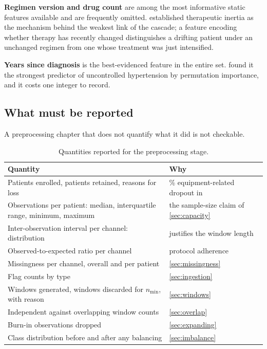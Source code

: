 \documentclass[12pt,a4paper,oneside]{report}
\begin{document}
\textbf{Regimen version and drug count} are among the most informative static features available and are frequently omitted.  established therapeutic inertia as the mechanism behind the weakest link of the cascade; a feature encoding whether therapy has recently changed distinguishes a drifting patient under an unchanged regimen from one whose treatment was just intensified.

\textbf{Years since diagnosis} is the best-evidenced feature in the entire set. \Textcite{mendoza2025} found it the strongest predictor of uncontrolled hypertension by permutation importance, and it costs one integer to record.

\subsection{What must be reported}\label{sec:reporting}

A preprocessing chapter that does not quantify what it did is not checkable.

\begin{table}[htbp]
\centering\footnotesize
\caption{Quantities reported for the preprocessing stage.}\label{tab:preprocessing-report}
\begin{tabularx}{\textwidth}{@{}X >{\raggedright\arraybackslash}p{5.2cm}@{}}
\toprule
\textbf{Quantity} & \textbf{Why} \\
\midrule
Patients enrolled, patients retained, reasons for loss & 10.9\% equipment-related dropout in \textcite{mihevc2025} \\
Observations per patient: median, interquartile range, minimum, maximum & the sample-size claim of \cref{sec:capacity} \\
Inter-observation interval per channel: distribution & justifies the window length \\
Observed-to-expected ratio per channel & protocol adherence \\
Missingness per channel, overall and per patient & \cref{sec:missingness} \\
Flag counts by type & \cref{sec:ingestion} \\
Windows generated, windows discarded for $n_{\min}$, with reason & \cref{sec:windows} \\
Independent against overlapping window counts & \cref{sec:overlap} \\
Burn-in observations dropped & \cref{sec:expanding} \\
Class distribution before and after any balancing & \cref{sec:imbalance} \\
\bottomrule
\end{tabularx}
\end{table}
\end{document}
